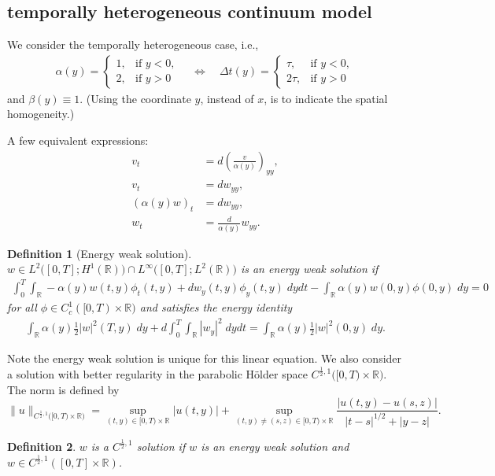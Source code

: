 \documentclass[a4paper,11pt]{article}
\newtheorem{definition}{Definition}[section]
\theoremstyle{remark}
\begin{document}
\subsection{temporally heterogeneous continuum model}
We consider the temporally heterogeneous case, i.e.,
\begin{align*}
     \alpha(y) = \left\{\begin{array}{ll}
        1, & \text{if } y<0,\\
        2, & \text{if } y>0
        \end{array}\right. 
        \quad \Longleftrightarrow \quad
     \Delta t(y) = \left\{\begin{array}{ll}
        \tau, & \text{if } y<0,\\
        2\tau, & \text{if } y>0
        \end{array}\right.         
\end{align*}
and $\beta(y)\equiv 1$. (Using the coordinate $y$, instead of $x$, is to indicate the spatial homogeneity.)

A few equivalent expressions:
\begin{equation} \label{eq:continuum}
\begin{aligned}
 v_t &= d (\frac{v}{\alpha(y)})_{yy},\\
 v_t &= d w_{yy},\\
 (\alpha(y) w)_t &= d w_{yy},\\
 w_t &= \frac{d}{\alpha(y)} w_{yy}.
\end{aligned}
\end{equation}
\begin{definition}[Energy weak solution]
 $w \in L^2\Big([0,T];H^1( \mathbb{R})\Big) \cap L^\infty\Big([0,T];L^2( \mathbb{R})\Big)$ is an energy weak solution if
 \begin{align*}
  \int_0^T \int_\mathbb{R} -\alpha(y)w(t,y)\phi_t(t,y) + d w_y(t,y)\phi_y(t,y)\; dydt - \int_\mathbb{R} \alpha(y)w(0,y)\phi(0,y) \;dy = 0
 \end{align*}
 for all $\phi \in C_c^1([0,T)\times \mathbb{R})$ and satisfies the energy identity
\begin{align*}
 \int_\mathbb{R} \alpha(y) \frac{1}{2} |w|^2(T,y)\; dy + d \int_0^T\int_\mathbb{R} |w_y|^2 \; dydt = \int_\mathbb{R} \alpha(y) \frac{1}{2} |w|^2(0,y)\; dy.
\end{align*}
\end{definition}
Note the energy weak solution is unique for this linear equation. We also consider a solution with better regularity in the parabolic H\"older space $C^{\frac{1}{2},1}\big([0,T)\times \mathbb{R}\big)$. The norm is defined by
$$\|u\|_{C^{\frac{1}{2},1}\big([0,T)\times \mathbb{R}\big)} = \sup_{(t,y)\in [0,T)\times \mathbb{R}}|u(t,y)| + \sup_{(t,y)\ne(s,z) \in [0,T)\times \mathbb{R}} \frac{|u(t,y)-u(s,z)|}{|t-s|^{1/2} + |y-z|}.$$
\begin{definition}
$w$ is a $C^{\frac{1}{2},1}$ solution if $w$ is an energy weak solution and $w \in C^{\tfrac{1}{2},1}([0,T]\times\mathbb{R})$. 
\end{definition}
\end{document}
